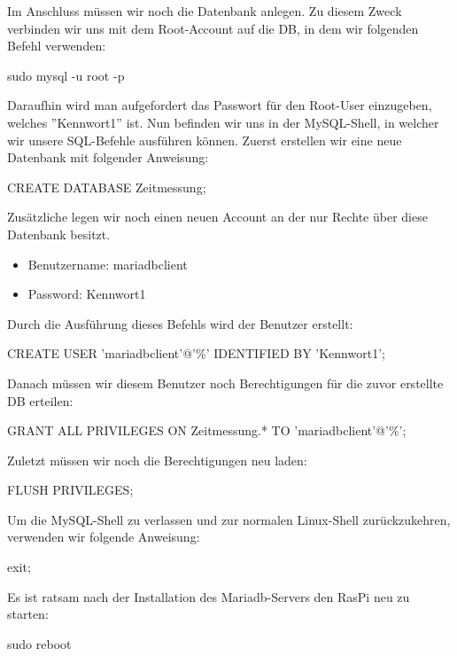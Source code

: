 \newpage
Im Anschluss müssen wir noch die Datenbank anlegen. Zu diesem Zweck verbinden wir uns mit dem Root-Account auf die \ac{DB}, in dem wir folgenden Befehl verwenden:

\begin{Textfeld1}
	sudo mysql -u root -p
\end{Textfeld1}

Daraufhin wird man aufgefordert das Passwort für den Root-User einzugeben, welches ''Kennwort1'' ist. Nun befinden wir uns in der MySQL-Shell, in welcher wir unsere SQL-Befehle ausführen können. Zuerst erstellen wir eine neue Datenbank mit folgender Anweisung:

\begin{Textfeld2}
	CREATE DATABASE Zeitmessung;
\end{Textfeld2}

Zusätzliche legen wir noch einen neuen Account an der nur Rechte über diese Datenbank besitzt.

\begin{itemize}
	\item Benutzername: mariadbclient
	\item Password: Kennwort1
\end{itemize}


Durch die Ausführung dieses Befehls wird der Benutzer erstellt:
\begin{Textfeld2}
	CREATE USER 'mariadbclient'@'\%' IDENTIFIED BY 'Kennwort1'; 
\end{Textfeld2}

Danach müssen wir diesem Benutzer noch Berechtigungen für die zuvor erstellte \ac{DB} erteilen:
\begin{Textfeld2}
	GRANT ALL PRIVILEGES ON Zeitmessung.* TO 'mariadbclient'@'\%'; 
\end{Textfeld2}

Zuletzt müssen wir noch die Berechtigungen neu laden:
\begin{Textfeld2}
	FLUSH PRIVILEGES;
\end{Textfeld2}

Um die MySQL-Shell zu verlassen und zur normalen Linux-Shell zurückzukehren, verwenden wir folgende Anweisung:

\begin{Textfeld2}
	exit;
\end{Textfeld2}

Es ist ratsam nach der Installation des Mariadb-Servers den \ac{RasPi} neu zu starten:
\begin{Textfeld1}
	sudo reboot
\end{Textfeld1}


